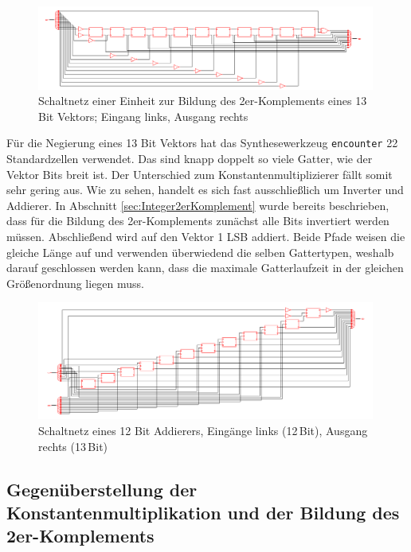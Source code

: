 \begin{figure}[htpb]
\centering
\includegraphics[width=0.99\textwidth]{img/13Bit_Negierer.png}
\caption{Schaltnetz einer Einheit zur Bildung des 2er-Komplements eines 13 Bit Vektors; Eingang links, Ausgang rechts}
\label{pic:13BitInverter}
\end{figure}

Für die Negierung eines 13 Bit Vektors hat das Synthesewerkzeug \texttt{encounter} 22 Standardzellen verwendet. Das sind knapp doppelt so viele Gatter, wie der Vektor 
Bits breit ist. Der Unterschied zum Konstantenmultiplizierer fällt somit sehr gering aus. 
Wie zu sehen, handelt es sich fast ausschließlich um Inverter und Addierer. In Abschnitt \ref{sec:Integer2erKomplement} wurde bereits beschrieben, dass für die Bildung des
2er-Komplements zunächst alle Bits invertiert werden müssen. Abschließend wird auf den Vektor 1 LSB addiert. 
Beide Pfade weisen die gleiche Länge auf und verwenden überwiedend die selben
Gattertypen, weshalb darauf geschlossen werden kann, dass die maximale Gatterlaufzeit in der gleichen Größenordnung liegen muss.


\begin{figure}[htbp]
 \centering
 \includegraphics[width=0.99\textwidth]{img/13Bit_Addierer.png}
 \caption{Schaltnetz eines 12 Bit Addierers, Eingänge links (12\,Bit), Ausgang rechts (13\,Bit)}
 \label{pic:13BitAddierer}
\end{figure}




\subsection{Gegenüberstellung der Konstantenmultiplikation und der Bildung des 2er-Komplements}

